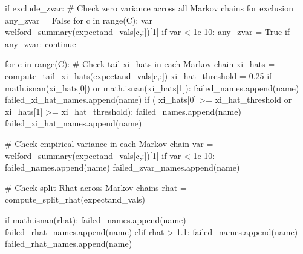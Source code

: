 \documentclass[
  letterpaper,
  DIV=11,
  numbers=noendperiod]{scrartcl}
\newenvironment{Shaded}{\begin{snugshade}}{\end{snugshade}}
\newcommand{\BuiltInTok}[1]{\textcolor[rgb]{0.00,0.23,0.31}{#1}}
\newcommand{\CommentTok}[1]{\textcolor[rgb]{0.37,0.37,0.37}{#1}}
\newcommand{\ControlFlowTok}[1]{\textcolor[rgb]{0.00,0.23,0.31}{#1}}
\newcommand{\DecValTok}[1]{\textcolor[rgb]{0.68,0.00,0.00}{#1}}
\newcommand{\FloatTok}[1]{\textcolor[rgb]{0.68,0.00,0.00}{#1}}
\newcommand{\KeywordTok}[1]{\textcolor[rgb]{0.00,0.23,0.31}{#1}}
\newcommand{\NormalTok}[1]{\textcolor[rgb]{0.00,0.23,0.31}{#1}}
\newcommand{\OperatorTok}[1]{\textcolor[rgb]{0.37,0.37,0.37}{#1}}
\newcommand{\VariableTok}[1]{\textcolor[rgb]{0.07,0.07,0.07}{#1}}
\begin{document}
\begin{Shaded}
\begin{Highlighting}[]
    \ControlFlowTok{if}\NormalTok{ exclude\_zvar:}
      \CommentTok{\# Check zero variance across all Markov chains for exclusion}
\NormalTok{      any\_zvar }\OperatorTok{=} \VariableTok{False}
      \ControlFlowTok{for}\NormalTok{ c }\KeywordTok{in} \BuiltInTok{range}\NormalTok{(C):}
\NormalTok{        var }\OperatorTok{=}\NormalTok{ welford\_summary(expectand\_vals[c,:])[}\DecValTok{1}\NormalTok{]}
        \ControlFlowTok{if}\NormalTok{ var }\OperatorTok{\textless{}} \FloatTok{1e{-}10}\NormalTok{:}
\NormalTok{          any\_zvar }\OperatorTok{=} \VariableTok{True}
      \ControlFlowTok{if}\NormalTok{ any\_zvar:}
        \ControlFlowTok{continue}
    
    \ControlFlowTok{for}\NormalTok{ c }\KeywordTok{in} \BuiltInTok{range}\NormalTok{(C):}
      \CommentTok{\# Check tail xi\_hats in each Markov chain}
\NormalTok{      xi\_hats }\OperatorTok{=}\NormalTok{ compute\_tail\_xi\_hats(expectand\_vals[c,:])}
\NormalTok{      xi\_hat\_threshold }\OperatorTok{=} \FloatTok{0.25}
      \ControlFlowTok{if}\NormalTok{ math.isnan(xi\_hats[}\DecValTok{0}\NormalTok{]) }\KeywordTok{or}\NormalTok{ math.isnan(xi\_hats[}\DecValTok{1}\NormalTok{]):}
\NormalTok{        failed\_names.append(name)}
\NormalTok{        failed\_xi\_hat\_names.append(name)}
      \ControlFlowTok{if}\NormalTok{ (   xi\_hats[}\DecValTok{0}\NormalTok{] }\OperatorTok{\textgreater{}=}\NormalTok{ xi\_hat\_threshold}
          \KeywordTok{or}\NormalTok{ xi\_hats[}\DecValTok{1}\NormalTok{] }\OperatorTok{\textgreater{}=}\NormalTok{ xi\_hat\_threshold):}
\NormalTok{        failed\_names.append(name)}
\NormalTok{        failed\_xi\_hat\_names.append(name)}
    
      \CommentTok{\# Check empirical variance in each Markov chain}
\NormalTok{      var }\OperatorTok{=}\NormalTok{ welford\_summary(expectand\_vals[c,:])[}\DecValTok{1}\NormalTok{]}
      \ControlFlowTok{if}\NormalTok{ var }\OperatorTok{\textless{}} \FloatTok{1e{-}10}\NormalTok{:}
\NormalTok{        failed\_names.append(name)}
\NormalTok{        failed\_zvar\_names.append(name)}
    
    \CommentTok{\# Check split Rhat across Markov chains}
\NormalTok{    rhat }\OperatorTok{=}\NormalTok{ compute\_split\_rhat(expectand\_vals)}
    
    \ControlFlowTok{if}\NormalTok{ math.isnan(rhat):}
\NormalTok{      failed\_names.append(name)}
\NormalTok{      failed\_rhat\_names.append(name)}
    \ControlFlowTok{elif}\NormalTok{ rhat }\OperatorTok{\textgreater{}} \FloatTok{1.1}\NormalTok{:}
\NormalTok{      failed\_names.append(name)}
\NormalTok{      failed\_rhat\_names.append(name)}
    

\end{Highlighting}
\end{Shaded}
\end{document}
